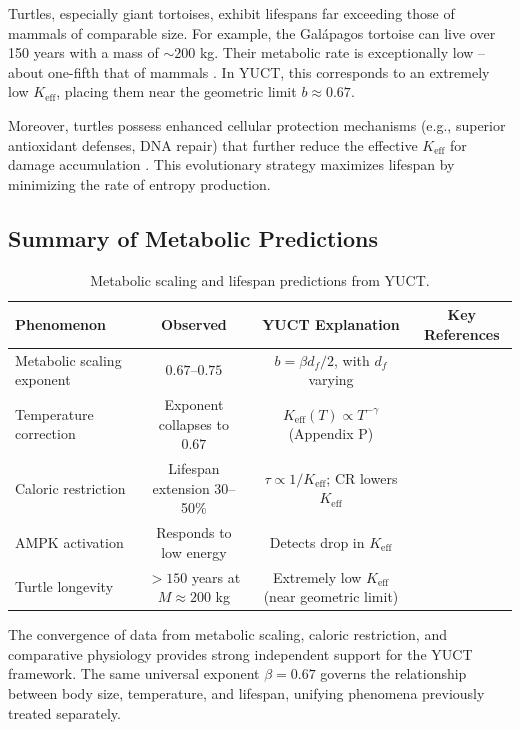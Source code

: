 \documentclass[11pt]{article}
\newcommand{\Keff}{K_{\mathrm{eff}}}
\begin{document}
	Turtles, especially giant tortoises, exhibit lifespans far exceeding those of mammals of comparable size. For example, the Galápagos tortoise can live over 150 years with a mass of \(\sim 200\) kg. Their metabolic rate is exceptionally low – about one-fifth that of mammals \cite{Southwood2001}. In YUCT, this corresponds to an extremely low \(\Keff\), placing them near the geometric limit \(b \approx 0.67\).
	
	Moreover, turtles possess enhanced cellular protection mechanisms (e.g., superior antioxidant defenses, DNA repair) that further reduce the effective \(\Keff\) for damage accumulation \cite{Csiszar2012}. This evolutionary strategy maximizes lifespan by minimizing the rate of entropy production.
	
	\subsection{Summary of Metabolic Predictions}
	
	\begin{table}[h]
		\centering
		\caption{Metabolic scaling and lifespan predictions from YUCT.}
		\label{tab:metabolism}
		\begin{tabular}{lccc}
			\toprule
			\textbf{Phenomenon} & \textbf{Observed} & \textbf{YUCT Explanation} & \textbf{Key References} \\
			\midrule
			Metabolic scaling exponent & \(0.67\)–\(0.75\) & \(b = \beta d_f/2\), with \(d_f\) varying & \cite{Killen2016, SICB2022} \\
			Temperature correction & Exponent collapses to \(0.67\) & \(K_{\mathrm{eff}}(T) \propto T^{-\gamma}\) (Appendix P) & \cite{SICB2022} \\
			Caloric restriction & Lifespan extension 30–50\% & \(\tau \propto 1/K_{\mathrm{eff}}\); CR lowers \(K_{\mathrm{eff}}\) & \cite{Masoro2005, Fontana2010} \\
			AMPK activation & Responds to low energy & Detects drop in \(K_{\mathrm{eff}}\) & \cite{Hardie2012} \\
			Turtle longevity & \(>150\) years at \(M \approx 200\) kg & Extremely low \(K_{\mathrm{eff}}\) (near geometric limit) & \cite{Southwood2001, Csiszar2012} \\
			\bottomrule
		\end{tabular}
	\end{table}
	
	The convergence of data from metabolic scaling, caloric restriction, and comparative physiology provides strong independent support for the YUCT framework. The same universal exponent \(\beta = 0.67\) governs the relationship between body size, temperature, and lifespan, unifying phenomena previously treated separately.
	
\end{document}
